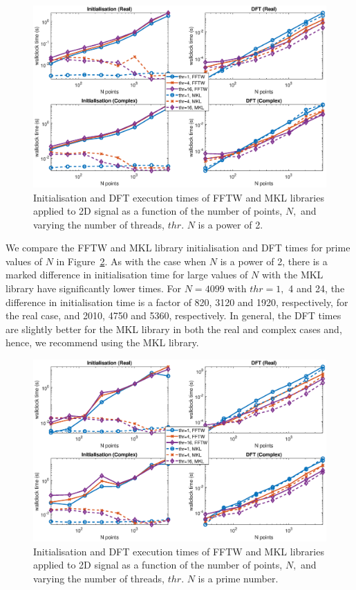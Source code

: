 \documentclass[a4paper]{article}
\begin{document}
\begin{figure}[htb]
    \centering
    \includegraphics[width=0.9\linewidth]{../results/fftw_mkl_2_2d_thr.eps}
  \caption{Initialisation and DFT execution times of FFTW and MKL libraries applied to 2D signal as a function of the
    number of points, $N,$ and varying the number of threads, $thr.$ $N$ is a power of 2.}
  \label{2DFFTWMKL2}
\end{figure}


We compare the FFTW and MKL library initialisation and DFT times for
prime values of $N$ in Figure~\ref{2DFFTWMKLPrime}. As with the case
when $N$ is a power of 2, there is a marked difference in
initialisation time for large values of $N$ with the MKL library have
significantly lower times. For $N=4099$ with $thr=1,$ 4 and 24, the
difference in initialisation time is a factor of 820, 3120 and 1920,
respectively, for the real case, and 2010, 4750 and 5360,
respectively. In general, the DFT times are slightly better for the
MKL library in both the real and complex cases and, hence, we
recommend using the MKL library.

\begin{figure}[htb]
    \centering
    \includegraphics[width=0.9\linewidth]{../results/fftw_mkl_prime_2d_thr.eps}
  \caption{Initialisation and DFT execution times of FFTW and MKL libraries applied to 2D signal as a function of the
    number of points, $N,$ and varying the number of threads, $thr.$ $N$ is a prime number.}
  \label{2DFFTWMKLPrime}
\end{figure}
\end{document}
